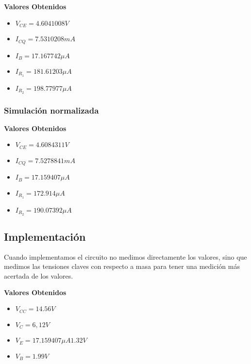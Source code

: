 \begin{multicols}{2}
				\textbf{Valores Obtenidos}
                \begin{itemize}[nosep]
					\item $V_{CE} = 4.6041008 V$
					\item $I_{CQ}= 7.5310208 mA$
					\item $I_B = 17.167742\mu A$
					\item $I_{R_1} = 181.61203\mu A$
					\item $I_{R_2} = 198.77977\mu A$
				\end{itemize}
			\subsubsection{Simulación normalizada}
            \begin{minipage}[t]{\linewidth}\end{minipage}\columnbreak{}
				\textbf{Valores Obtenidos}
                \begin{itemize}[nosep]
					\item $V_{CE} = 4.6084311 V$
					\item $I_{CQ}= 7.5278841 mA$
					\item $I_B = 17.159407\mu A$
					\item $I_{R_1} = 172.914\mu A$
					\item $I_{R_2} = 190.07392\mu A$
				\end{itemize}



		\subsection{Implementación}
			\sangria{}Cuando implementamos el circuito no medimos directamente los valores, sino que medimos las tensiones claves con respecto a masa para tener una medición más acertada de los valores.

			\textbf{Valores Obtenidos}
            \begin{itemize}[nosep]
				\item $V_{CC} = 14.56V$
                \item $V_{C} = 6,12V$
                \item $V_{E}= 17.159407\mu A1.32V$
                \item $V_{B} = 1.99V$\\[5pt]
            \end{itemize}


\end{multicols}
